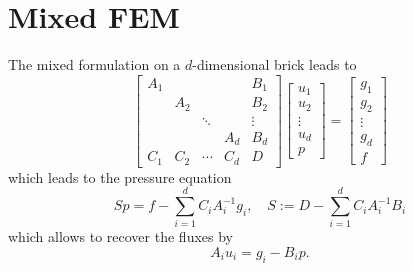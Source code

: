 \documentclass[12pt, english]{article}
\begin{document}
\section{Mixed FEM}\label{sec:}
%
The mixed formulation on a $d$-dimensional brick leads to
%
\begin{equation}\label{eq:structfemsys}
\begin{bmatrix}
A_1 && &  & B_1 \\
 & A_2 &&  & B_2 \\
&&\ddots&&\vdots  \\
& &  &  A_d& B_d \\
C_1 & C_2 &\cdots & C_d & D
\end{bmatrix}
\begin{bmatrix}
  u_1 \\ u_2 \\ \vdots \\ u_d \\ p
\end{bmatrix}
=
\begin{bmatrix}
  g_1 \\ g_2 \\ \vdots \\ g_d \\ f
\end{bmatrix}
\end{equation}
which leads to the pressure equation
\begin{equation}\label{eq:structfemsys}
  S p = f - \sum_{i=1}^d C_i A_i^{-1} g_i,\quad S := D - \sum_{i=1}^d C_i A_i^{-1}B_i
\end{equation}
  which allows to recover the fluxes by
\begin{equation*}
  A_i u_i = g_i  - B_i p.
\end{equation*}

%
\end{document}
